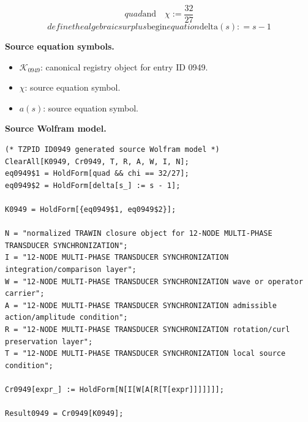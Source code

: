 \[
quad \text{and}\quad \chi := \frac{32}{27}
\]
\[
define the algebraic surplus \mathrm{begin}{equation} \mathrm{delta}(s) : =s-1
\]

\begin{minipage}[t]{0.49\linewidth}
\begingroup
\small
\raggedright
\textbf{Source equation symbols.}\par
\begin{itemize}[leftmargin=1.35em,itemsep=1pt,topsep=1pt,parsep=0pt]
    \item $\mathcal{K}_{0949}$: canonical registry object for entry ID 0949.
    \item $\chi$: source equation symbol.
    \item $a(s)$: source equation symbol.
\end{itemize}
\endgroup
\end{minipage}\hfill
\begin{minipage}[t]{0.47\linewidth}
\begingroup
\scriptsize
\raggedright
\textbf{Source Wolfram model.}\par
\begin{Verbatim}[fontsize=\tiny,breaklines=true,breakanywhere=true]
(* TZPID ID0949 generated source Wolfram model *)
ClearAll[K0949, Cr0949, T, R, A, W, I, N];
eq0949$1 = HoldForm[quad && chi == 32/27];
eq0949$2 = HoldForm[delta[s_] := s - 1];

K0949 = HoldForm[{eq0949$1, eq0949$2}];

N = "normalized TRAWIN closure object for 12-NODE MULTI-PHASE TRANSDUCER SYNCHRONIZATION";
I = "12-NODE MULTI-PHASE TRANSDUCER SYNCHRONIZATION integration/comparison layer";
W = "12-NODE MULTI-PHASE TRANSDUCER SYNCHRONIZATION wave or operator carrier";
A = "12-NODE MULTI-PHASE TRANSDUCER SYNCHRONIZATION admissible action/amplitude condition";
R = "12-NODE MULTI-PHASE TRANSDUCER SYNCHRONIZATION rotation/curl preservation layer";
T = "12-NODE MULTI-PHASE TRANSDUCER SYNCHRONIZATION local source condition";

Cr0949[expr_] := HoldForm[N[I[W[A[R[T[expr]]]]]]];

Result0949 = Cr0949[K0949];
\end{Verbatim}
\endgroup
\end{minipage}

